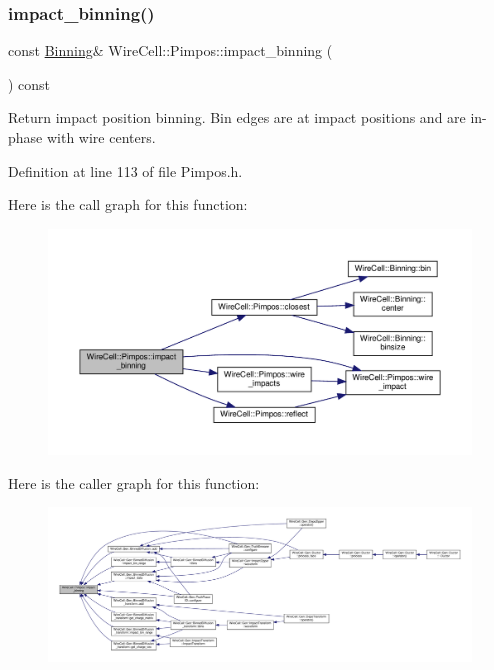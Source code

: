 \subsubsection{\texorpdfstring{impact\+\_\+binning()}{impact\_binning()}}
{\footnotesize\ttfamily const \hyperlink{class_wire_cell_1_1_binning}{Binning}\& Wire\+Cell\+::\+Pimpos\+::impact\+\_\+binning (\begin{DoxyParamCaption}{ }\end{DoxyParamCaption}) const\hspace{0.3cm}{\ttfamily [inline]}}

Return impact position binning. Bin edges are at impact positions and are in-\/phase with wire centers. 

Definition at line 113 of file Pimpos.\+h.

Here is the call graph for this function\+:
\nopagebreak
\begin{figure}[H]
\begin{center}
\leavevmode
\includegraphics[width=350pt]{class_wire_cell_1_1_pimpos_a1b8aef1ec7d1cf9eb9d5d78a6359e2aa_cgraph}
\end{center}
\end{figure}
Here is the caller graph for this function\+:
\nopagebreak
\begin{figure}[H]
\begin{center}
\leavevmode
\includegraphics[width=350pt]{class_wire_cell_1_1_pimpos_a1b8aef1ec7d1cf9eb9d5d78a6359e2aa_icgraph}
\end{center}
\end{figure}
\mbox{\label{class_wire_cell_1_1_pimpos_a2728ed20a76edaab2b09f7cfacf5d99b}} 
